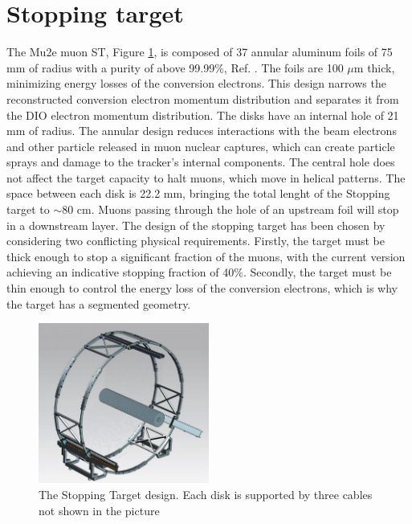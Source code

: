 \section{Stopping target}
The Mu2e muon ST, Figure \ref{fig:ST}, is 
composed of 37 annular aluminum foils  of 75 mm of radius with a purity of 
above 99.99\%, Ref. \cite{bobbb}. The foils are 100 $\mu$m thick, 
minimizing energy losses of the conversion electrons. This design 
narrows the reconstructed conversion electron momentum distribution 
and separates it from the DIO electron momentum distribution. 
The disks have an internal hole of 21 mm of radius.
The annular design reduces interactions with the beam electrons and 
other particle released in muon nuclear captures, which can create 
particle sprays and damage to the tracker's internal components. 
The central hole does not affect the target capacity to halt muons, 
which move in helical patterns. The space between each disk is
22.2 mm, bringing the total lenght of the Stopping target to $\sim$80 cm.
Muons passing through the hole of an upstream foil will stop in a downstream layer. 
The design of the stopping target has been chosen by considering two 
conflicting physical requirements. Firstly, the target must be thick enough 
to stop a significant fraction of the muons, with the current version achieving 
an indicative stopping fraction of 40\%. Secondly, the target must be thin 
enough to control the energy loss of the conversion electrons, which is why 
the target has a segmented geometry.
\begin{figure}[!h]
    \centering
    \includegraphics[width =0.5\textwidth]{figures/png/Screenshot_20240706_122723.png}
    \caption{The Stopping Target design. 
    Each disk is supported by three cables not shown in the picture }
    \label{fig:ST}
\end{figure}

